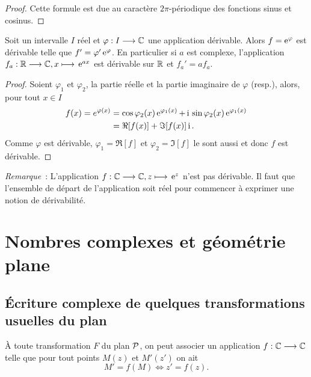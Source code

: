 \begin{proof}
  Cette formule est due au caractère \(2\pi\)-périodique des fonctions sinus 
  et cosinus.
\end{proof}

\begin{prop}
  Soit un intervalle \(I\) réel et \(\fonctionR{\varphi}{I}{\C}\) une application 
  dérivable. Alors \(f = \e^\varphi\) est dérivable telle que \(f' = \varphi' 
  \e^\varphi\). En particulier si \(a\) est complexe, l'application 
  \(\fonctionL{f_a}{\R}{\C}{x}{\e^{ax}}\) est dérivable sur \(\R\) et \(f_a' = 
  af_a\).
\end{prop}

\begin{proof}
  Soient \(\varphi_1\) et \(\varphi_2\), la partie réelle et la partie 
  imaginaire de \(\varphi\) (resp.), alors, pour tout \(x \in{}I\)
  \begin{align*}
    f(x) = e^{\varphi(x)}& = \cos \varphi_2(x) \e^{\varphi_1(x)}+ \ii{}\sin 
    \varphi_2(x)\e^{\varphi_1(x)}\\ 
    & = \Re[f(x)] + \Im[f(x)]\ii.
  \end{align*}
  Comme \(\varphi\) est dérivable, \(\varphi_1 = \Re[f]\) et \(\varphi_2 = 
  \Im[f]\) le sont aussi et donc \(f\) est dérivable.
\end{proof}

\emph{Remarque}~: L'application \(\fonctionL{f}{\C}{\C}{z}{\e^z}\) n'est pas 
dérivable. Il faut que l'ensemble de départ de l'application soit réel pour 
commencer à exprimer une notion de dérivabilité.

\section{Nombres complexes et géométrie plane}
\label{sec:complexesetgeometrie}

\subsection{Écriture complexe de quelques transformations usuelles du plan}
\label{subsec:ecriturecomplexeettransformations}

À toute transformation \(F\) du plan \(\P\), on peut associer un application 
\(\fonctionR{f}{\C}{\C}\) telle que pour tout points \(M(z)\) et \(M'(z')\) on 
ait
\begin{equation}
  M' = f(M) \iff z' = f(z).
\end{equation}


